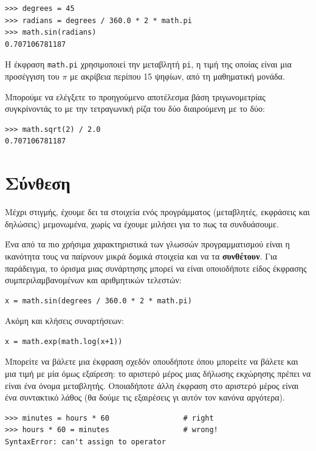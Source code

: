 \documentclass[10pt]{book}
\begin{document}
\begin{verbatim}
>>> degrees = 45
>>> radians = degrees / 360.0 * 2 * math.pi
>>> math.sin(radians)
0.707106781187
\end{verbatim}
%

Η έκφραση {\tt math.pi} χρησιμοποιεί την μεταβλητή {\tt pi}, η τιμή της οποίας είναι μια προσέγγιση του $\pi$ με ακρίβεια περίπου 15 ψηφίων, από τη μαθηματική μονάδα.


Μπορούμε να ελέγξετε το προηγούμενο αποτέλεσμα βάση τριγωνομετρίας 
συγκρίνοντάς το με την τετραγωνική ρίζα του δύο διαιρούμενη με το δύο:


\begin{verbatim}
>>> math.sqrt(2) / 2.0
0.707106781187
\end{verbatim}
%


\section{Σύνθεση}

Μέχρι στιγμής, έχουμε δει τα στοιχεία ενός προγράμματος (μεταβλητές,
εκφράσεις και δηλώσεις) μεμονωμένα, χωρίς να έχουμε μιλήσει για το πως
τα συνδυάσουμε.

Ένα από τα πιο χρήσιμα χαρακτηριστικά των γλωσσών προγραμματισμού
είναι η ικανότητα τους να παίρνουν μικρά δομικά στοιχεία και να τα {\bf συνθέτουν}.
Για παράδειγμα, το όρισμα μιας συνάρτησης μπορεί να είναι οποιοδήποτε είδος
έκφρασης συμπεριλαμβανομένων και αριθμητικών τελεστών:


\begin{verbatim}
x = math.sin(degrees / 360.0 * 2 * math.pi)
\end{verbatim}
%

Ακόμη και κλήσεις συναρτήσεων:

\begin{verbatim}
x = math.exp(math.log(x+1))
\end{verbatim}
%

Μπορείτε να βάλετε μια έκφραση σχεδόν οπουδήποτε όπου μπορείτε να βάλετε και μια τιμή με μία όμως εξαίρεση: το αριστερό μέρος μιας δήλωσης εκχώρησης πρέπει να είναι ένα όνομα μεταβλητής. Οποιαδήποτε άλλη έκφραση στο αριστερό μέρος
είναι ένα συντακτικό λάθος (θα δούμε τις εξαιρέσεις γι αυτόν τον κανόνα
αργότερα).


\begin{verbatim}
>>> minutes = hours * 60                 # right
>>> hours * 60 = minutes                 # wrong!
SyntaxError: can't assign to operator
\end{verbatim}
%
\end{document}

